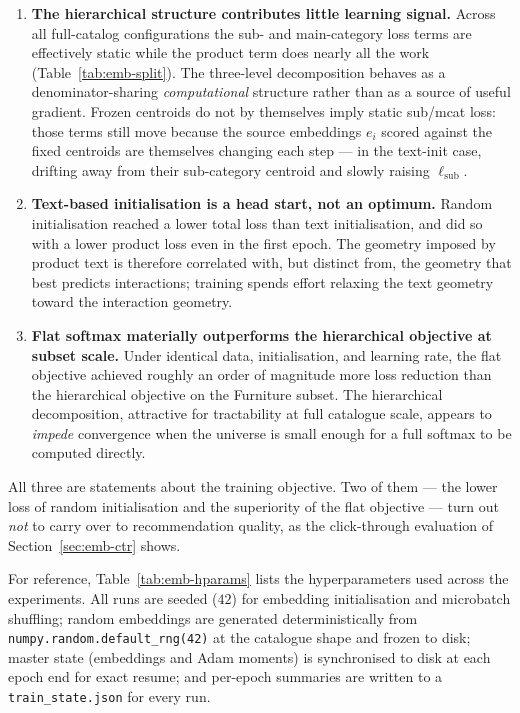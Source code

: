 \begin{enumerate}
  \item \textbf{The hierarchical structure contributes little learning signal.}
        Across all full-catalog configurations the sub- and main-category loss
        terms are effectively static while the product term does nearly all the
        work (Table~\ref{tab:emb-split}). The three-level decomposition behaves
        as a denominator-sharing \emph{computational} structure rather than as a
        source of useful gradient. Frozen centroids do not by themselves imply
        static sub/mcat loss: those terms still move because the source
        embeddings $e_i$ scored against the fixed centroids are themselves
        changing each step --- in the text-init case, drifting away from their
        sub-category centroid and slowly raising $\ell_{\text{sub}}$.
  \item \textbf{Text-based initialisation is a head start, not an optimum.}
        Random initialisation reached a lower total loss than text
        initialisation, and did so with a lower product loss even in the first
        epoch. The geometry imposed by product text is therefore correlated
        with, but distinct from, the geometry that best predicts interactions;
        training spends effort relaxing the text geometry toward the interaction
        geometry.
  \item \textbf{Flat softmax materially outperforms the hierarchical objective
        at subset scale.} Under identical data, initialisation, and learning
        rate, the flat objective achieved roughly an order of magnitude more
        loss reduction than the hierarchical objective on the Furniture subset.
        The hierarchical decomposition, attractive for tractability at full
        catalogue scale, appears to \emph{impede} convergence when the universe
        is small enough for a full softmax to be computed directly.
\end{enumerate}

All three are statements about the training objective. Two of them --- the
lower loss of random initialisation and the superiority of the flat objective
--- turn out \emph{not} to carry over to recommendation quality, as the
click-through evaluation of Section~\ref{sec:emb-ctr} shows.

For reference, Table~\ref{tab:emb-hparams} lists the hyperparameters used across
the experiments. All runs are seeded ($42$) for embedding initialisation and
microbatch shuffling; random embeddings are generated deterministically from
\texttt{numpy.random.default\_rng(42)} at the catalogue shape and frozen to
disk; master state (embeddings and Adam moments) is synchronised to disk at each
epoch end for exact resume; and per-epoch summaries are written to a
\texttt{train\_state.json} for every run.

